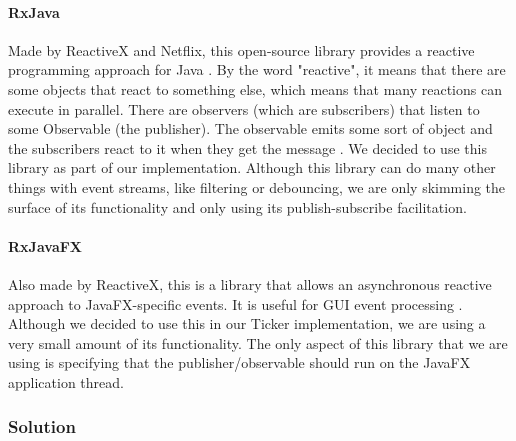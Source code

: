 \documentclass[a4paper,11pt,titlepage]{article}
\begin{document}
\paragraph{RxJava}
Made by ReactiveX and Netflix, this open-source library provides a reactive programming approach for Java \cite{rxjava}. By the word "reactive", it means that there are some objects that react to something else, which means that many reactions can execute in parallel. There are observers (which are subscribers) that listen to some Observable (the publisher). The observable emits some sort of object and the subscribers react to it when they get the message \cite{reactivex}. We decided to use this library as part of our implementation. Although this library can do many other things with  event streams, like filtering or debouncing, we are only skimming the surface of its functionality and only using its publish-subscribe facilitation.
\paragraph{RxJavaFX}
Also made by ReactiveX, this is a library that allows an asynchronous reactive approach to JavaFX-specific events. It is useful for GUI event processing \cite{rxjavafx}. Although we decided to use this in our Ticker implementation, we are using a very small amount of its functionality. The only aspect of this library that we are using is specifying that the publisher/observable should run on the JavaFX application thread.

\subsubsection{Solution}
\end{document}
